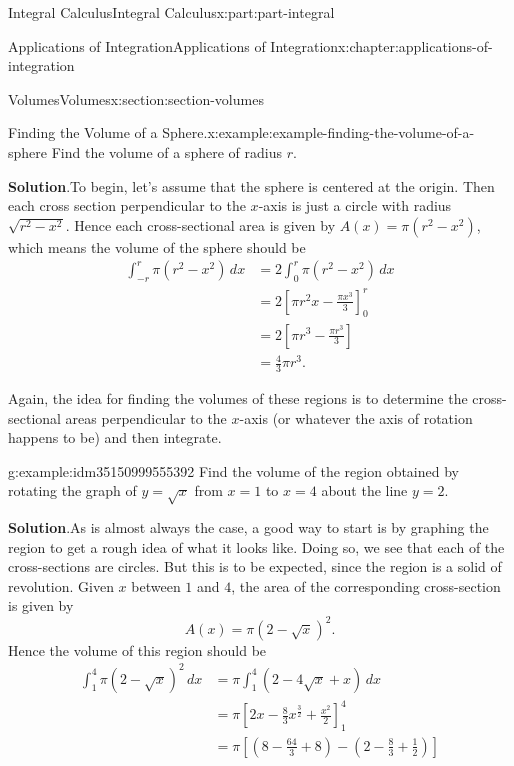 \documentclass[twoside,10pt,]{tufte-book}
\newcommand{\blocktitlefont}{\relax}
\numberwithin{equation}{part}
\newcommand{\amp}{&}
\begin{document}
\begin{partptx}{Integral Calculus}{}{Integral Calculus}{}{}{x:part:part-integral}
\begin{chapterptx}{Applications of Integration}{}{Applications of Integration}{}{}{x:chapter:applications-of-integration}
\begin{sectionptx}{Volumes}{}{Volumes}{}{}{x:section:section-volumes}
\begin{example}{Finding the Volume of a Sphere.}{x:example:example-finding-the-volume-of-a-sphere}
Find the volume of a sphere of radius \(r\).%
\par\smallskip%
\noindent\textbf{\blocktitlefont Solution}.\hypertarget{g:solution:idm35150999558976}{}\quad{}To begin, let's assume that the sphere is centered at the origin. Then each cross section perpendicular to the \(x\)-axis is just a circle with radius \(\sqrt{r^{2} - x^{2}}\). Hence each cross-sectional area is given by \(A(x) = \pi(r^{2} - x^{2})\), which means the volume of the sphere should be%
\begin{align*}
\int_{-r}^{r}\pi(r^{2} - x^{2})\,dx \amp= 2\int_{0}^{r}\pi(r^{2} - x^{2})\,dx\\
\amp= 2\left[\pi r^{2}x - \frac{\pi x^{3}}{3}\right]_{0}^{r}\\
\amp= 2\left[\pi r^{3} - \frac{\pi r^{3}}{3}\right]\\
\amp= \frac{4}{3}\pi r^{3}.
\end{align*}
%
\end{example}
Again, the idea for finding the volumes of these regions is to determine the cross-sectional areas perpendicular to the \(x\)-axis (or whatever the axis of rotation happens to be) and then integrate.%
\begin{example}{}{g:example:idm35150999555392}%
Find the volume of the region obtained by rotating the graph of \(y = \sqrt{x}\) from \(x = 1\) to \(x = 4\) about the line \(y = 2\).%
\par\smallskip%
\noindent\textbf{\blocktitlefont Solution}.\hypertarget{g:solution:idm35150999553344}{}\quad{}As is almost always the case, a good way to start is by graphing the region to get a rough idea of what it looks like. Doing so, we see that each of the cross-sections are circles. But this is to be expected, since the region is a solid of revolution. Given \(x\) between \(1\) and \(4\), the area of the corresponding cross-section is given by%
\begin{equation*}
A(x) = \pi(2 - \sqrt{x})^{2}.
\end{equation*}
Hence the volume of this region should be%
\begin{align*}
\int_{1}^{4}\pi(2 - \sqrt{x})^{2}\,dx \amp= \pi\int_{1}^{4}(2 - 4\sqrt{x} + x)\,dx\\
\amp= \pi\left[2x - \frac{8}{3}x^{\frac{3}{2}} + \frac{x^{2}}{2}\right]_{1}^{4}\\
\amp= \pi\left[\left(8 - \frac{64}{3} + 8\right) - \left(2 - \frac{8}{3} + \frac{1}{2}\right)\right]
\end{align*}
%
\end{example}

\end{sectionptx}
\end{chapterptx}
\end{partptx}
\end{document}
